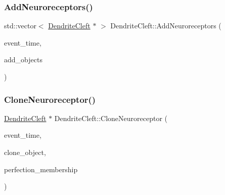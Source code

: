 \subsubsection{\texorpdfstring{Add\+Neuroreceptors()}{AddNeuroreceptors()}}
{\footnotesize\ttfamily std\+::vector$<$ \mbox{\hyperlink{classDendriteCleft}{Dendrite\+Cleft}} $\ast$ $>$ Dendrite\+Cleft\+::\+Add\+Neuroreceptors (\begin{DoxyParamCaption}\item[{std\+::chrono\+::time\+\_\+point$<$ \mbox{\hyperlink{universe_8h_a0ef8d951d1ca5ab3cfaf7ab4c7a6fd80}{Clock}} $>$}]{event\+\_\+time,  }\item[{std\+::vector$<$ \mbox{\hyperlink{classDendriteCleft}{Dendrite\+Cleft}} $\ast$$>$}]{add\+\_\+objects }\end{DoxyParamCaption})}

\mbox{\label{classDendriteCleft_a7650e1115baab30729da0b03a48da851}} 
\subsubsection{\texorpdfstring{Clone\+Neuroreceptor()}{CloneNeuroreceptor()}}
{\footnotesize\ttfamily \mbox{\hyperlink{classDendriteCleft}{Dendrite\+Cleft}} $\ast$ Dendrite\+Cleft\+::\+Clone\+Neuroreceptor (\begin{DoxyParamCaption}\item[{std\+::chrono\+::time\+\_\+point$<$ \mbox{\hyperlink{universe_8h_a0ef8d951d1ca5ab3cfaf7ab4c7a6fd80}{Clock}} $>$}]{event\+\_\+time,  }\item[{\mbox{\hyperlink{classDendriteCleft}{Dendrite\+Cleft}} $\ast$}]{clone\+\_\+object,  }\item[{double}]{perfection\+\_\+membership }\end{DoxyParamCaption})}

\mbox{\label{classDendriteCleft_a93b542418482f3732380e33346e23bd2}} 
